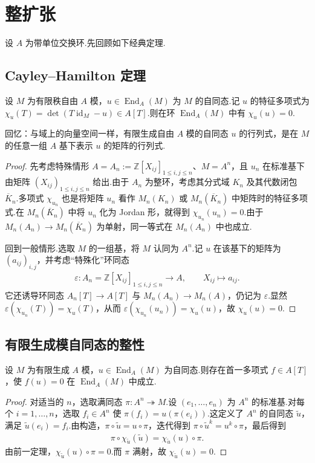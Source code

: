 \section{整扩张}\label{sec:nt-2-2}
设 $A$ 为带单位交换环.先回顾如下经典定理.
\subsection{Cayley--Hamilton 定理}\label{sec:nt-2-2-1}
\begin{theorem*}
设 $M$ 为有限秩自由 $A$ 模，$u\in\operatorname{End}_A(M)$ 为 $M$ 的自同态.记 $u$ 的特征多项式为 $\chi_u(T)=\det(T\operatorname{id}_M-u)\in A[T]$.则在环 $\operatorname{End}_A(M)$ 中有 $\chi_u(u)=0$.
\end{theorem*}
回忆：与域上的向量空间一样，有限生成自由 $A$ 模的自同态 $u$ 的行列式，是在 $M$ 的任意一组 $A$ 基下表示 $u$ 的矩阵的行列式.
\begin{proof}
先考虑特殊情形 $A=A_n:=\mathbb Z[X_{ij}]_{1\le i,j\le n}$、$M=A^n$，且 $u_n$ 在标准基下由矩阵 $(X_{ij})_{1\le i,j\le n}$ 给出.由于 $A_n$ 为整环，考虑其分式域 $K_n$ 及其代数闭包 $\overline K_n$.多项式 $\chi_{u_n}$ 也是将矩阵 $u_n$ 看作 $M_n(K_n)$ 或 $M_n(\overline K_n)$ 中矩阵时的特征多项式.在 $M_n(\overline K_n)$ 中将 $u_n$ 化为 Jordan 形，就得到 $\chi_{u_n}(u_n)=0$.由于 $M_n(A_n)\longrightarrow M_n(\overline K_n)$ 为单射，同一等式在 $M_n(A_n)$ 中也成立.

回到一般情形.选取 $M$ 的一组基，将 $M$ 认同为 $A^n$.记 $u$ 在该基下的矩阵为 $(a_{ij})_{i,j}$，并考虑``特殊化''环同态
\begin{align*}
\varepsilon:A_n=\mathbb Z[X_{ij}]_{1\le i,j\le n}\longrightarrow A,\qquad X_{ij}\longmapsto a_{ij}.
\end{align*}
它还诱导环同态 $A_n[T]\longrightarrow A[T]$ 与 $M_n(A_n)\longrightarrow M_n(A)$，仍记为 $\varepsilon$.显然 $\varepsilon(\chi_{u_n}(T))=\chi_u(T)$，从而 $\varepsilon(\chi_{u_n}(u_n))=\chi_u(u)$，故 $\chi_u(u)=0$.
\end{proof}

\subsection{有限生成模自同态的整性}\label{sec:nt-2-2-2}
\begin{corollary*}
设 $M$ 为有限生成 $A$ 模，$u\in\operatorname{End}_A(M)$ 为自同态.则存在首一多项式 $f\in A[T]$，使 $f(u)=0$ 在 $\operatorname{End}_A(M)$ 中成立.
\end{corollary*}
\begin{proof}
对适当的 $n$，选取满同态 $\pi:A^n\twoheadrightarrow M$.设 $(e_1,\ldots,e_n)$ 为 $A^n$ 的标准基.对每个 $i=1,\ldots,n$，选取 $f_i\in A^n$ 使 $\pi(f_i)=u(\pi(e_i))$.这定义了 $A^n$ 的自同态 $\widetilde u$，满足 $\widetilde u(e_i)=f_i$.由构造，$\pi\circ\widetilde u=u\circ\pi$，迭代得到 $\pi\circ\widetilde u^k=u^k\circ\pi$，最后得到
\begin{align*}
\pi\circ\chi_{\widetilde u}(\widetilde u)=\chi_{\widetilde u}(u)\circ\pi.
\end{align*}
由前一定理，$\chi_{\widetilde u}(u)\circ\pi=0$.而 $\pi$ 满射，故 $\chi_{\widetilde u}(u)=0$.
\end{proof}


